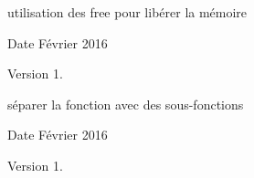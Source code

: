 
\begin{DoxyRefList}
\item[\label{todo__todo000002}%
\hypertarget{todo__todo000002}{}%
Global(e) \hyperlink{element_8h_acb1c6de5172f617d3d2ca9aeed40930d_acb1c6de5172f617d3d2ca9aeed40930d}{close\-\_\-tabs} ()]utilisation des free pour libérer la mémoire \begin{DoxyDate}{Date}
Février 2016 
\end{DoxyDate}
\begin{DoxyVersion}{Version}
1.  
\end{DoxyVersion}

\item[\label{todo__todo000001}%
\hypertarget{todo__todo000001}{}%
Global(e) \hyperlink{element_8h_a1d52ded0b9f031b3de7c4ef152b7e8d1_a1d52ded0b9f031b3de7c4ef152b7e8d1}{init\-\_\-manager\-\_\-way} (S\-D\-L\-\_\-\-Surface $\ast$window)]séparer la fonction avec des sous-\/fonctions \begin{DoxyDate}{Date}
Février 2016 
\end{DoxyDate}
\begin{DoxyVersion}{Version}
1. 
\end{DoxyVersion}

\end{DoxyRefList}